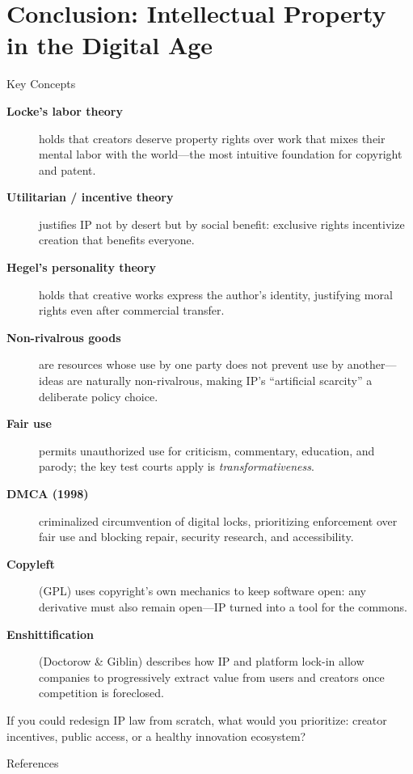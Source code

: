 ﻿\documentclass[aspectratio=169,11pt]{beamer}
\begin{document}
\section{Conclusion: Intellectual Property in the Digital Age}
\begin{frame}[allowframebreaks]{Key Concepts}
\footnotesize
\begin{description}
    \item[\textbf{Locke's labor theory}] holds that creators deserve property rights over work that mixes their mental labor with the world---the most intuitive foundation for copyright and patent.
    \item[\textbf{Utilitarian / incentive theory}] justifies IP not by desert but by social benefit: exclusive rights incentivize creation that benefits everyone.
    \item[\textbf{Hegel's personality theory}] holds that creative works express the author's identity, justifying moral rights even after commercial transfer.
    \item[\textbf{Non-rivalrous goods}] are resources whose use by one party does not prevent use by another---ideas are naturally non-rivalrous, making IP's ``artificial scarcity'' a deliberate policy choice.
    \item[\textbf{Fair use}] permits unauthorized use for criticism, commentary, education, and parody; the key test courts apply is \textit{transformativeness}.
    \item[\textbf{DMCA (1998)}] criminalized circumvention of digital locks, prioritizing enforcement over fair use and blocking repair, security research, and accessibility.
    \item[\textbf{Copyleft}] (GPL) uses copyright's own mechanics to keep software open: any derivative must also remain open---IP turned into a tool for the commons.
    \item[\textbf{Enshittification}] (Doctorow \& Giblin) describes how IP and platform lock-in allow companies to progressively extract value from users and creators once competition is foreclosed.
\end{description}

\begin{discussionbox}[Discussion]
If you could redesign IP law from scratch, what would you prioritize: creator incentives, public access, or a healthy innovation ecosystem?
\end{discussionbox}
\end{frame}

\begin{frame}[allowframebreaks]{References}
\printbibliography[heading=none]
\end{frame}
\end{document}
